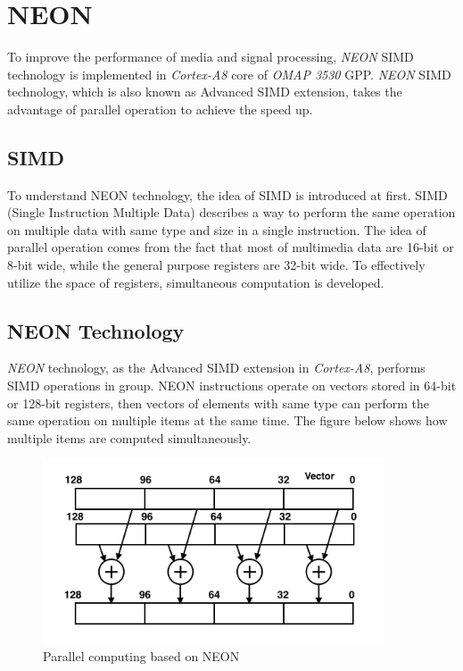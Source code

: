 \section{NEON}
To improve the performance of media and signal processing, 
\emph{NEON} SIMD technology is implemented in \emph{Cortex-A8} core of \emph{OMAP 3530} GPP. 
\emph{NEON} SIMD technology, which is also known as Advanced SIMD extension, 
takes the advantage of parallel operation to achieve the speed up.
\subsection{SIMD}
To understand NEON technology, the idea of SIMD is introduced at first. 
SIMD (Single Instruction Multiple Data) describes a way to perform the same operation on multiple data with same type and size in a single instruction. 
The idea of parallel operation comes from the fact that most of multimedia data are 16-bit or 8-bit wide, while the general purpose registers are 32-bit wide. 
To effectively utilize the space of registers, simultaneous computation is developed.  
\subsection{NEON Technology} 
\emph{NEON} technology, as the Advanced SIMD extension in \emph{Cortex-A8}, performs SIMD operations in group. 
NEON instructions operate on vectors stored in 64-bit or 128-bit registers, 
then vectors of elements with same type can perform the same operation on multiple items at the same time.
The figure below shows how multiple items are computed simultaneously. 

\begin{figure}[h]
\centering
\includegraphics[width=0.9\textwidth]{neon}
\caption{Parallel computing based on NEON}
\label{fig:neon}
\end{figure}

